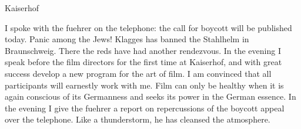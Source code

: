 Kaiserhof

I spoke with the fuehrer on the telephone: the call for boycott will be published today. Panic among the Jews! Klagges has banned the Stahlhelm in Braunschweig. There the reds have had another rendezvous. In the evening I speak before the film directors for the first time at Kaiserhof, and with great success develop a new program for the art of film. I am convinced that all participants will earnestly work with me. Film can only be healthy when it is again conscious of its Germanness and seeks its power in the German essence. In the evening I give the fuehrer a report on repercussions of the boycott appeal over the telephone. Like a thunderstorm, he has cleansed the atmosphere.
